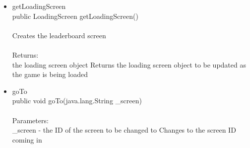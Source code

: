 \documentclass[letterpaper]{article}
\begin{document}
\begin{itemize}
\begin{itemize}
											\item	getLoadingScreen \\
													public LoadingScreen getLoadingScreen() \\ \\
													Creates the leaderboard screen \\ \\
													Returns: \\
													the loading screen object Returns the loading screen object to be updated as the game is being loaded
											\item	goTo \\
													public void goTo(java.lang.String \_screen) \\ \\
													Parameters: \\ 
													\_screen - the ID of the screen to be changed to Changes to the screen ID coming in
										\end{itemize}
							\end{itemize}
							
\end{document}
